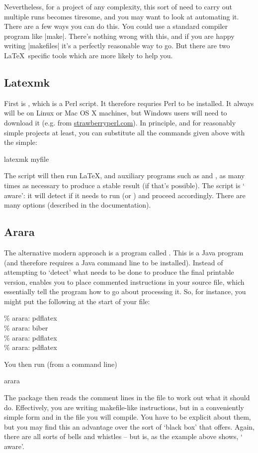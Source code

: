 Nevertheless, for a project of any complexity, this sort of need to carry out multiple runs becomes tiresome, and you may want to look at automating it. There are a few ways you can do this. You could use a standard compiler program like |make|. There's nothing wrong with this, and if you are happy writing |makefiles| it's a perfectly reasonable way to go. But there are two \LaTeX\ specific tools which are more likely to help you.

\subsection{Latexmk}
First is , which is a Perl script. It therefore requries Perl to be installed. It always will be on Linux or Mac OS X machines, but Windows users will need to download it (e.g. from \url{strawberryperl.com}). In principle, and for reasonably simple projects at least, you can substitute all the commands given above with the simple:
\begin{pseudoverb}
latexmk myfile
\end{pseudoverb}
The script will then run \LaTeX, and auxiliary programs such as  and , as many times as necessary to produce a stable result (if that's possible). The  script is ` aware': it will detect if it needs to run  (or \bibtex) and proceed accordingly. There are many options (described in the documentation).

\subsection{Arara}

The alternative modern approach is a program called . This is a Java program (and therefore requires a Java command line to be installed). Instead of attempting to `detect' what needs to be done to produce the final printable version,  enables you to place commented instructions in your source file, which essentially tell the program how to go about processing it. So, for instance, you might put the following at the start of your file:
\begin{pseudoverb}
\% arara: pdflatex\\
\% arara: biber\\
\% arara: pdflatex\\
\% arara: pdflatex
\end{pseudoverb}
You then run (from a command line)
\begin{pseudoverb}
arara 
\end{pseudoverb}
The package then reads the comment lines in the file to work out what it should do. Effectively, you are writing makefile-like instructions, but in a conveniently simple form and in the file you will compile. You have to be explicit about them, but you may find this an advantage over the sort of `black box' that  offers. Again, there are all sorts of bells and whistles -- but  is, as the example above shows, ` aware'.

